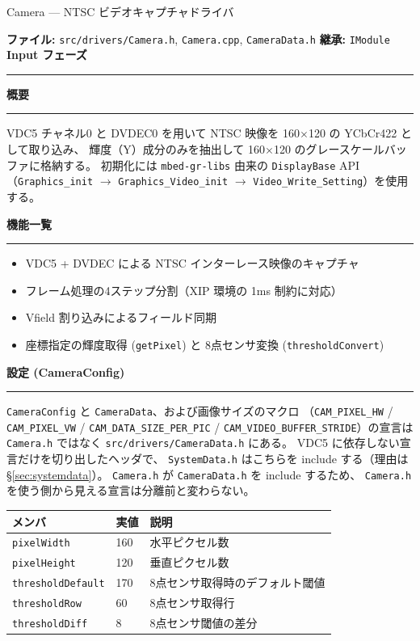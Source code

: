 \documentclass[a4paper,11pt,dvipdfmx]{jsarticle}
\makeatletter
\newcommand{\apisection}[1]{%
  \par\addvspace{4mm}%
  {\normalsize\bfseries\color{headerblue} #1}%
  \par\vspace{-1mm}%
  {\color{accentblue!40}\rule{\linewidth}{0.5pt}}%
  \par\nobreak\vspace{2mm}%
  \@afterheading
}
\newcommand{\phasebadge}[1]{%
  \colorbox{accentblue!10}{\small\bfseries\color{accentblue!80!black}\,#1\,}%
}
\makeatother
\begin{document}
\begin{apibox}{Camera --- NTSC ビデオキャプチャドライバ}

\textbf{ファイル:} \texttt{src/drivers/Camera.h}, \texttt{Camera.cpp},
\texttt{CameraData.h} \hfill
\textbf{継承:} \texttt{IModule} \hfill
\phasebadge{Input フェーズ}

\vspace{2mm}\hrule\vspace{2mm}

\apisection{概要}

VDC5 チャネル0 と DVDEC0 を用いて NTSC 映像を 160$\times$120 の YCbCr422 として取り込み、
輝度（Y）成分のみを抽出して 160$\times$120 のグレースケールバッファに格納する。
初期化には \texttt{mbed-gr-libs} 由来の \texttt{DisplayBase} API
（\texttt{Graphics\_init} $\rightarrow$ \texttt{Graphics\_Video\_init} $\rightarrow$
\texttt{Video\_Write\_Setting}）を使用する。

\apisection{機能一覧}

\begin{itemize}[nosep]
  \item VDC5 + DVDEC による NTSC インターレース映像のキャプチャ
  \item フレーム処理の4ステップ分割（XIP 環境の 1ms 制約に対応）
  \item Vfield 割り込みによるフィールド同期
  \item 座標指定の輝度取得 (\texttt{getPixel}) と 8点センサ変換 (\texttt{thresholdConvert})
\end{itemize}

\apisection{設定 (CameraConfig)}

\texttt{CameraConfig} と \texttt{CameraData}、および画像サイズのマクロ
（\texttt{CAM\_PIXEL\_HW} / \texttt{CAM\_PIXEL\_VW} /
\texttt{CAM\_DATA\_SIZE\_PER\_PIC} / \texttt{CAM\_VIDEO\_BUFFER\_STRIDE}）の宣言は
\texttt{Camera.h} ではなく \texttt{src/drivers/CameraData.h} にある。
VDC5 に依存しない宣言だけを切り出したヘッダで、
\texttt{SystemData.h} はこちらを include する（理由は
\hyperref[sec:systemdata]{§\ref*{sec:systemdata}}）。
\texttt{Camera.h} が \texttt{CameraData.h} を include するため、
\texttt{Camera.h} を使う側から見える宣言は分離前と変わらない。

\begin{tabularx}{\textwidth}{l l X}
\toprule
\textbf{メンバ} & \textbf{実値} & \textbf{説明} \\
\midrule
\texttt{pixelWidth}       & 160 & 水平ピクセル数 \\
\texttt{pixelHeight}      & 120 & 垂直ピクセル数 \\
\texttt{thresholdDefault} & 170 & 8点センサ取得時のデフォルト閾値 \\
\texttt{thresholdRow}     & 60  & 8点センサ取得行 \\
\texttt{thresholdDiff}    & 8   & 8点センサ閾値の差分 \\
\bottomrule
\end{tabularx}


\end{apibox}
\end{document}
